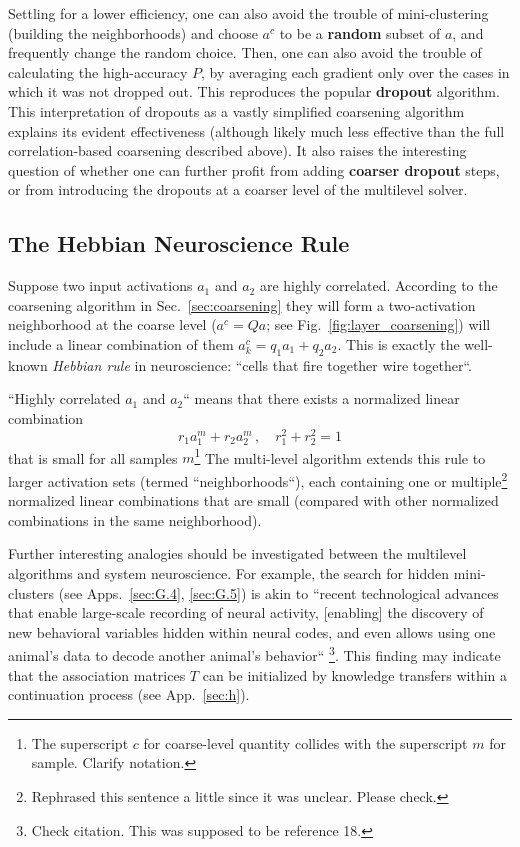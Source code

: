 \documentclass{article} %
\begin{document}
Settling for a lower efficiency, one can also avoid the trouble of mini-clustering (building the neighborhoods) and choose $a^c$ to be a \textbf{random} subset of $a$, and frequently change the random choice. Then, one can also avoid the trouble of calculating the high-accuracy $P$, by averaging each gradient only over the cases in which it was not dropped out. This reproduces the popular \textbf{dropout} algorithm. This interpretation of dropouts as a vastly simplified coarsening algorithm explains its evident effectiveness (although likely much less effective than the full correlation-based coarsening described above). It also raises the interesting question of whether one can further profit from adding \textbf{coarser dropout} steps, or from introducing the dropouts at a coarser level of the multilevel solver.

\subsection{The Hebbian Neuroscience Rule}
Suppose two input activations $a_1$ and $a_2$ are highly correlated. According to the coarsening algorithm in Sec.~\ref{sec:coarsening} they will form a two-activation neighborhood at the coarse level ($a^c = Q a$; see Fig.~\ref{fig:layer_coarsening}) will include a linear combination of them $a^c_k = q_1 a_1 + q_2 a_2$. This is exactly the well-known {\it Hebbian rule} in neuroscience: ``cells that fire together wire together``.

``Highly correlated $a_1$ and $a_2$`` means that there exists a normalized linear combination
$$ r_1 a^m_1 + r_2 a^m_2\,, \quad r_1^2 + r_2^2 = 1 $$
that is small for all samples $m$\footnote{The superscript $c$ for coarse-level quantity collides with the superscript $m$ for sample. Clarify notation.} The multi-level algorithm extends this rule to larger activation sets (termed ``neighborhoods``), each containing one or multiple\footnote{Rephrased this sentence a little since it was unclear. Please check.} normalized linear combinations that are small (compared with other normalized combinations in the same neighborhood).

Further interesting analogies should be investigated between the multilevel algorithms and system neuroscience. For example, the search for hidden mini-clusters (see Apps.~\ref{sec:G.4}, \ref{sec:G.5}) is akin to ``recent technological advances that enable large-scale recording of neural activity, [enabling] the discovery of new behavioral variables hidden within neural codes, and even allows using one animal's data to decode another animal's behavior`` \cite{18}\footnote{Check citation. This was supposed to be reference 18.}. This finding may indicate that the association matrices $T$ can be initialized by knowledge transfers within a continuation process (see App.~\ref{sec:h}).
\end{document}
